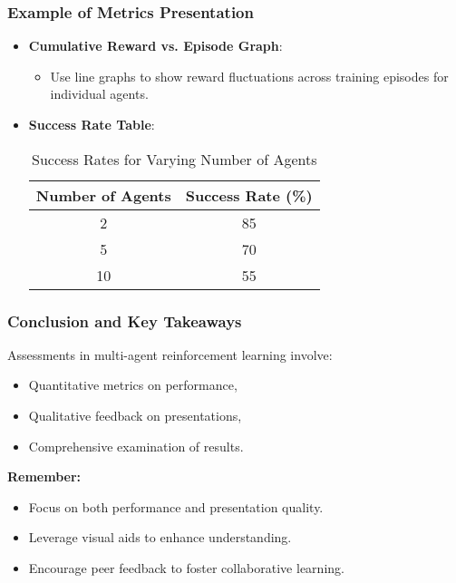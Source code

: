 \documentclass[aspectratio=169]{beamer}
\begin{document}
\begin{frame}[fragile]
    \frametitle{Example of Metrics Presentation}
    \begin{itemize}
        \item \textbf{Cumulative Reward vs. Episode Graph}:
            \begin{itemize}
                \item Use line graphs to show reward fluctuations across training episodes for individual agents.
            \end{itemize}
        
        \item \textbf{Success Rate Table}:
            \begin{table}[ht]
                \centering
                \begin{tabular}{|c|c|}
                    \hline
                    \textbf{Number of Agents} & \textbf{Success Rate (\%)} \\
                    \hline
                    2 & 85 \\
                    5 & 70 \\
                    10 & 55 \\
                    \hline
                \end{tabular}
                \caption{Success Rates for Varying Number of Agents}
            \end{table}
    \end{itemize}
\end{frame}

\begin{frame}[fragile]
    \frametitle{Conclusion and Key Takeaways}
    Assessments in multi-agent reinforcement learning involve:
    \begin{itemize}
        \item Quantitative metrics on performance, 
        \item Qualitative feedback on presentations, 
        \item Comprehensive examination of results.
    \end{itemize}

    \textbf{Remember:}
    \begin{itemize}
        \item Focus on both performance and presentation quality.
        \item Leverage visual aids to enhance understanding.
        \item Encourage peer feedback to foster collaborative learning.
    \end{itemize}
\end{frame}
\end{document}
